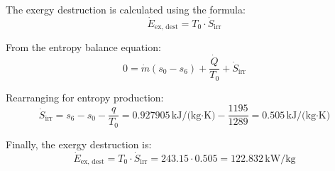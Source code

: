 The exergy destruction is calculated using the formula:  
\[
\dot{E}_{\text{ex, dest}} = T_0 \cdot \dot{S}_{\text{irr}}
\]  

From the entropy balance equation:  
\[
0 = \dot{m} (s_0 - s_6) + \frac{\dot{Q}}{T_0} + \dot{S}_{\text{irr}}
\]  

Rearranging for entropy production:  
\[
\dot{S}_{\text{irr}} = s_6 - s_0 - \frac{q}{T_0} = 0.927905 \, \text{kJ/(kg·K)} - \frac{1195}{1289} = 0.505 \, \text{kJ/(kg·K)}
\]  

Finally, the exergy destruction is:  
\[
\dot{E}_{\text{ex, dest}} = T_0 \cdot \dot{S}_{\text{irr}} = 243.15 \cdot 0.505 = 122.832 \, \text{kW/kg}
\]